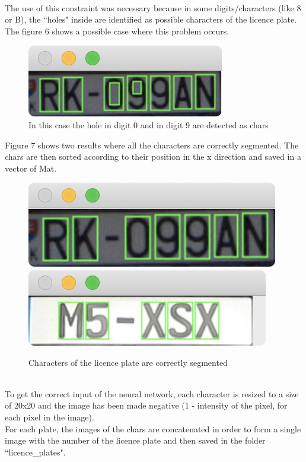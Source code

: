 \documentclass[11pt]{article}
\begin{document}
\begin{titlepage}
{\\The use of this constraint was necessary because in some digits/characters (like 8 or B), the ``holes" inside are identified as possible characters of the licence plate.
\\The figure 6 shows a possible case where this problem occurs.
\newpage
\begin{figure}[htbp]
\centering
\includegraphics[totalheight=0.13\textwidth]{pro.jpg}
\caption{In this case the hole in digit 0 and in digit 9 are detected as chars}
\label{}
\end{figure}
\noindent
Figure 7 shows two results where all the characters are correctly segmented. The chars are then sorted according to their position in the x direction and saved in a vector of Mat.
\begin{figure}[htbp]
\centering
\includegraphics[totalheight=0.13\textwidth]{res.jpg}
\includegraphics[totalheight=0.13\textwidth]{targa.jpg}
\caption{Characters of the licence plate are correctly segmented}
\label{}
\end{figure}
\\To get the correct input of the neural network, each character is resized to a size of 20x20 and the image has been made negative (1 - intensity of the pixel, for each pixel in the image).
\\For each plate, the images of the chars are concatenated in order to form a single image with the number of the licence plate and then saved in the folder ``licence\_plates".
}
\end{titlepage}
\end{document}
